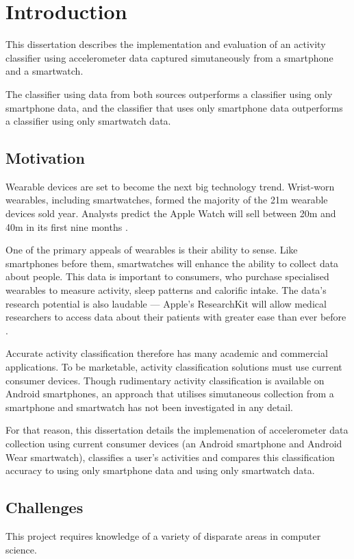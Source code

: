 \chapter{Introduction}
  This dissertation describes the implementation and evaluation of an activity classifier using 
  accelerometer data captured simutaneously from a smartphone and a smartwatch.  
  
  The classifier using data from both sources outperforms a classifier using only smartphone data,
  and the classifier that uses only smartphone data outperforms a classifier using only smartwatch 
  data.
  \section{Motivation}
  \label{sec:intro-motivation}
    Wearable devices are set to become the next big technology trend. Wrist-worn wearables, 
    including smartwatches, formed the majority of the 21m wearable devices sold year. Analysts
    predict the Apple Watch will sell between 20m and 40m in its first nine months 
    \cite{econapplewatch}.
    
    One of the primary appeals of wearables is their ability to sense. Like smartphones before them,
    smartwatches will enhance the ability to collect data about people. This data is important to
    consumers, who purchase specialised wearables to measure activity, sleep patterns and 
    calorific intake. The data's research potential is also laudable --- Apple's ResearchKit will
    allow medical researchers to access data about their patients with greater ease than ever
    before \cite{appleresearchkit}.
        
    Accurate activity classification therefore has many academic and commercial applications. To be
    marketable, activity classification solutions must use current consumer devices. Though 
    rudimentary activity classification is available on Android smartphones, an approach that
    utilises simutaneous collection from a smartphone and smartwatch has not been investigated in
    any detail.
     
    For that reason, this dissertation details the implemenation of accelerometer data collection using current 
    consumer devices (an Android smartphone and Android Wear smartwatch), classifies a user's 
    activities and compares this classification accuracy to using only smartphone data and using 
    only smartwatch data. 
    
  \section{Challenges}
  \label{sec:intro-challenges}
    This project requires knowledge of a variety of disparate areas in computer science. 
    
